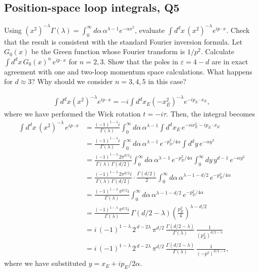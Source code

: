 \subsection{Position-space loop integrals, Q5}
Using $(x^2)^{-\lambda}\Gamma(\lambda) = \int_0^\infty d\alpha\,\alpha^{\lambda-1}e^{-\alpha x^2}$, evaluate $\int d^dx\,(x^2)^{-\lambda}e^{ip\cdot x}$. Check that the result is consistent with the standard Fourier inversion formula. Let $G_0(x)$ be the Green function whose Fourier transform is $1/p^2$. Calculate $\int d^dx\,G_0(x)^n\,e^{ip\cdot x }$ for $n=2,3$. Show that the poles in $\varepsilon = 4-d$ are in exact agreement with one and two-loop momentum space calculations. What happens for $d\approx 3$? Why should we consider $n=3,4,5$ in this case?
\begin{solution}
    \begin{equation}
    \begin{aligned}
        \int d^dx (x^2)^{-\lambda} e^{ip\cdot x} = -i \int d^dx_E (-x_E^2)^{-\lambda}e^{-ip_E \cdot x_E},
    \end{aligned}
    \end{equation}
    where we have performed the Wick rotation $t = -i \tau$. Then, the integral becomes
    \begin{equation}
    \begin{aligned}
        \int d^dx\, (x^2)^{-\lambda}\, e^{ip\cdot x}
        &= \frac{(-1)^{1-\lambda}i}{\Gamma(\lambda)}\int_0^\infty d\alpha\,\alpha^{\lambda-1}\int d^dx_E\, e^{-\alpha x_E^2 - ip_E\cdot x_E}\\
        &= \frac{(-1)^{1-\lambda}i}{\Gamma(\lambda)}\int_0^\infty d\alpha\,\alpha^{\lambda-1}\, e^{-p_E^2/4\alpha}\int d^dy\, e^{-\alpha y^2}\\
        &= \frac{(-1)^{1-\lambda}\, 2\pi^{d/2} i}{\Gamma(\lambda)\,\Gamma(d/2)}\int_0^\infty d\alpha\,\alpha^{\lambda-1}\, e^{-p_E^2/4\alpha}\int_0^\infty dy\, y^{d-1}\, e^{-\alpha y^2}\\
        &= \frac{(-1)^{1-\lambda}\, 2\pi^{d/2} i}{\Gamma(\lambda)\,\Gamma(d/2)}\cdot\frac{\Gamma(d/2)}{2}\int_0^\infty d\alpha\,\alpha^{\lambda-1-d/2}\, e^{-p_E^2/4\alpha}\\
        &= \frac{(-1)^{1-\lambda}\,\pi^{d/2} i}{\Gamma(\lambda)}\int_0^\infty d\alpha\,\alpha^{\lambda-1-d/2}\, e^{-p_E^2/4\alpha}\\
        &= \frac{(-1)^{1-\lambda}\,\pi^{d/2} i}{\Gamma(\lambda)}\,\Gamma\!\left(d/2-\lambda\right)\!\left(\frac{p_E^2}{4}\right)^{\!\lambda-d/2}\\
        &= i\,(-1)^{1-\lambda}\, 2^{\,d-2\lambda}\,\pi^{d/2}\,\frac{\Gamma\!\left(d/2-\lambda\right)}{\Gamma(\lambda)}\,\frac{1}{(p_E^2)^{d/2-\lambda}}\\
        &= i\,(-1)^{1-\lambda}\, 2^{\,d-2\lambda}\,\pi^{d/2}\,\frac{\Gamma\!\left(d/2-\lambda\right)}{\Gamma(\lambda)}\,\frac{1}{(-p^2)^{d/2-\lambda}},
    \end{aligned}
    \end{equation}
    where we have substituted $y = x_E + ip_E/2\alpha$.


\end{solution}
